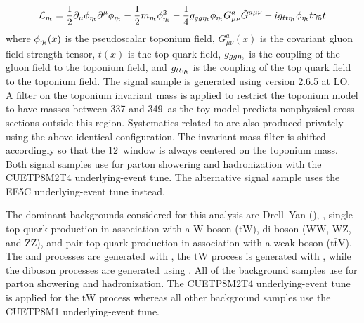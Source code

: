\begin{equation}
\label{eq:etat_langrangian}
    \mathcal{L}_{\eta_{\mathrm{t}}} = \frac{1}{2}\partial_{\mu} \phi_{\eta_{\mathrm{t}}} \partial^{\mu} \phi_{\eta_{\mathrm{t}}} - \frac{1}{2} m_{\eta_{\mathrm{t}}} \phi_{\eta_{\mathrm{t}}}^2 - \frac{1}{4} g_{gg\eta_{\mathrm{t}}} \phi_{\eta_{\mathrm{t}}} G^{a}_{\mu\nu} \Tilde{G}^{a\mu\nu}-ig_{tt\eta_{\mathrm{t}}} \phi_{\eta_{\mathrm{t}}} \bar{t} \gamma_{5} t
\end{equation}
where $\phi_{\eta_{\mathrm{t}}}(x)$ is the pseudoscalar toponium field, $G^{a}_{\mu\nu}(x)$ is the covariant gluon field strength tensor, $t(x)$ is the top quark field, $g_{gg\eta_{\mathrm{t}}}$ is the coupling of the gluon field to the toponium field, and $g_{tt\eta_{\mathrm{t}}}$ is the coupling of the top quark field to the toponium field. The \etat signal sample is generated using \MGaMCatNLOOnly version 2.6.5 at LO. A filter on the toponium invariant mass is applied to restrict the toponium model to have masses between 337 and 349~\GeV as the toy model predicts nonphysical cross sections outside this region. Systematics related to \etat are also produced privately using the above identical configuration. The invariant mass filter is shifted accordingly so that the 12~\GeV window is always centered on the toponium mass. Both signal samples use \Pythia for parton showering and hadronization with the CUETP8M2T4 underlying-event tune. The \Herwig alternative \ttbar signal sample uses the EE5C underlying-event tune instead.

The dominant backgrounds considered for this analysis are Drell--Yan (\zjets), \wjets, single top quark production in association with a W boson ($\mathrm{tW}$), di-boson ($\mathrm{WW}$, $\mathrm{WZ}$, and $\mathrm{ZZ}$), and pair top quark production in association with a weak boson ($\mathrm{t\bar{t}V}$). The \zjets and \wjets processes are generated with \MGMLM, the $\mathrm{tW}$ process is generated with \Powheg, while the diboson processes are generated using \Pythia. All of the background samples use \Pythia for parton showering and hadronization. The CUETP8M2T4 underlying-event tune is applied for the $\mathrm{tW}$ process whereas all other background samples use the \Pythia CUETP8M1 underlying-event tune.

